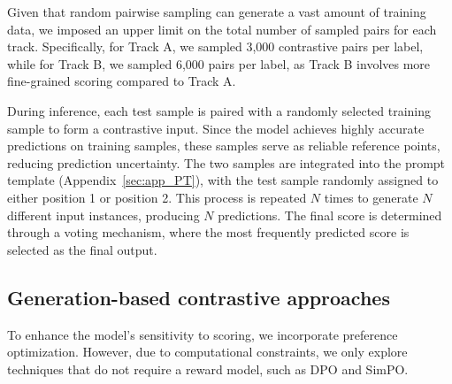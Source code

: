 \documentclass[11pt]{article}
\begin{document}

Given that random pairwise sampling can generate a vast amount of training data, we imposed an upper limit on the total number of sampled pairs for each track. Specifically, for Track A, we sampled 3,000 contrastive pairs per label, while for Track B, we sampled 6,000 pairs per label, as Track B involves more fine-grained scoring compared to Track A.


During inference, each test sample is paired with a randomly selected training sample to form a contrastive input. Since the model achieves highly accurate predictions on training samples, these samples serve as reliable reference points, reducing prediction uncertainty. The two samples are integrated into the prompt template (Appendix~\ref{sec:app_PT}), with the test sample randomly assigned to either position 1 or position 2. This process is repeated $N$ times to generate $N$ different input instances, producing $N$ predictions. The final score is determined through a voting mechanism, where the most frequently predicted score is selected as the final output.

\subsection{Generation-based contrastive approaches}


To enhance the model’s sensitivity to scoring, we incorporate preference optimization. However, due to computational constraints, we only explore techniques that do not require a reward model, such as DPO and SimPO.

\end{document}
